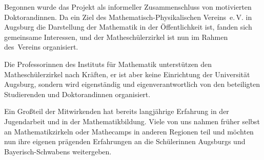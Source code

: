 \documentclass[12pt]{zettel}
\begin{document}
Begonnen wurde das Projekt als informeller Zusammenschluss von motivierten Doktorandinnen. Da ein Ziel des Mathematisch-Physikalischen Vereins~e.\,V. in Augsburg die Darstellung
der Mathematik in der Öffentlichkeit ist, fanden sich gemeinsame Interessen, und der Matheschülerzirkel ist nun im Rahmen des~Vereins organisiert.

Die Professorinnen des Instituts für Mathematik unterstützen den
Mathe\-schü\-ler\-zir\-kel nach Kräften, er ist aber keine Einrichtung der Universität
Augsburg, sondern wird eigenständig und eigenverantwortlich von den beteiligten Studierenden und Doktorandinnen organisiert.

Ein Großteil der Mitwirkenden hat bereits langjährige Erfahrung in
der Jugendarbeit und in der Mathematikbildung. Viele von uns nahmen früher selbst an Mathematikzirkeln oder
Mathecamps in anderen Regionen teil und möchten nun ihre eigenen prägenden Erfahrungen an die Schülerinnen Augsburgs und Bayerisch-Schwabens weitergeben.
\end{document}
